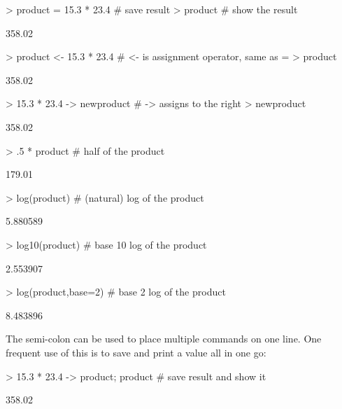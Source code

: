 \begin{Schunk}
\begin{Sinput}
> product = 15.3 * 23.4       # save result
> product                     # show the result
\end{Sinput}
\begin{Soutput}
[1] 358.02
\end{Soutput}
\begin{Sinput}
> product <- 15.3 * 23.4      # <- is assignment operator, same as =
> product                     
\end{Sinput}
\begin{Soutput}
[1] 358.02
\end{Soutput}
\begin{Sinput}
> 15.3 * 23.4 -> newproduct   # -> assigns to the right
> newproduct
\end{Sinput}
\begin{Soutput}
[1] 358.02
\end{Soutput}
\begin{Sinput}
> .5 * product                # half of the product
\end{Sinput}
\begin{Soutput}
[1] 179.01
\end{Soutput}
\begin{Sinput}
> log(product)                # (natural) log of the product
\end{Sinput}
\begin{Soutput}
[1] 5.880589
\end{Soutput}
\begin{Sinput}
> log10(product)              # base 10 log of the product
\end{Sinput}
\begin{Soutput}
[1] 2.553907
\end{Soutput}
\begin{Sinput}
> log(product,base=2)         # base 2 log of the product
\end{Sinput}
\begin{Soutput}
[1] 8.483896
\end{Soutput}
\end{Schunk}

The semi-colon can be used to place multiple commands on one line.  
One frequent use of this is to save and print a value all in one go:

\begin{Schunk}
\begin{Sinput}
> 15.3 * 23.4 -> product; product    # save result and show it
\end{Sinput}
\begin{Soutput}
[1] 358.02
\end{Soutput}
\end{Schunk}


